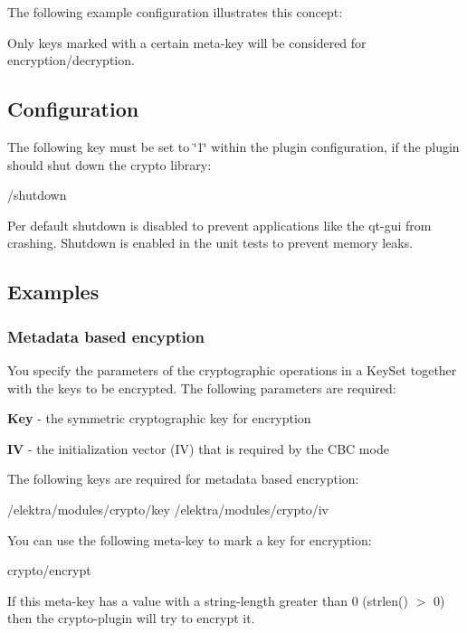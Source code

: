 The following example configuration illustrates this concept\+: 


Only keys marked with a certain meta-\/key will be considered for encryption/decryption.

\subsection*{Configuration}

The following key must be set to {\ttfamily \char`\"{}1\char`\"{}} within the plugin configuration, if the plugin should shut down the crypto library\+: \begin{DoxyVerb}    /shutdown
\end{DoxyVerb}


Per default shutdown is disabled to prevent applications like the qt-\/gui from crashing. Shutdown is enabled in the unit tests to prevent memory leaks.

\subsection*{Examples}

\subsubsection*{Metadata based encyption}

You specify the parameters of the cryptographic operations in a Key\+Set together with the keys to be encrypted. The following parameters are required\+:


\begin{DoxyItemize}
\item {\bfseries Key} -\/ the symmetric cryptographic key for encryption
\item {\bfseries I\+V} -\/ the initialization vector (I\+V) that is required by the C\+B\+C mode
\end{DoxyItemize}

The following keys are required for metadata based encryption\+: \begin{DoxyVerb}    /elektra/modules/crypto/key
    /elektra/modules/crypto/iv
\end{DoxyVerb}


You can use the following meta-\/key to mark a key for encryption\+: \begin{DoxyVerb}    crypto/encrypt
\end{DoxyVerb}


If this meta-\/key has a value with a string-\/length greater than 0 ({\ttfamily strlen() $>$ 0}) then the crypto-\/plugin will try to encrypt it. 